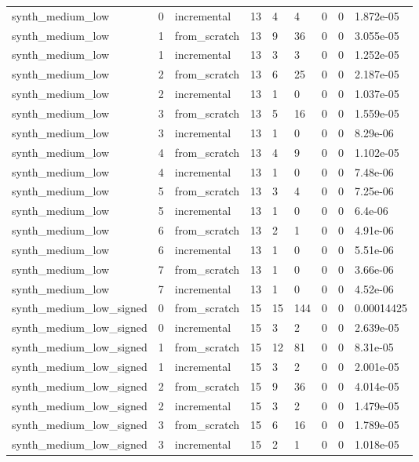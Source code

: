 \begin{table}[t]
\begin{tabular}{lllllllll}
synth\_medium\_low & 0 & incremental & 13 & 4 & 4 & 0 & 0 & 1.872e-05 \\
synth\_medium\_low & 1 & from\_scratch & 13 & 9 & 36 & 0 & 0 & 3.055e-05 \\
synth\_medium\_low & 1 & incremental & 13 & 3 & 3 & 0 & 0 & 1.252e-05 \\
synth\_medium\_low & 2 & from\_scratch & 13 & 6 & 25 & 0 & 0 & 2.187e-05 \\
synth\_medium\_low & 2 & incremental & 13 & 1 & 0 & 0 & 0 & 1.037e-05 \\
synth\_medium\_low & 3 & from\_scratch & 13 & 5 & 16 & 0 & 0 & 1.559e-05 \\
synth\_medium\_low & 3 & incremental & 13 & 1 & 0 & 0 & 0 & 8.29e-06 \\
synth\_medium\_low & 4 & from\_scratch & 13 & 4 & 9 & 0 & 0 & 1.102e-05 \\
synth\_medium\_low & 4 & incremental & 13 & 1 & 0 & 0 & 0 & 7.48e-06 \\
synth\_medium\_low & 5 & from\_scratch & 13 & 3 & 4 & 0 & 0 & 7.25e-06 \\
synth\_medium\_low & 5 & incremental & 13 & 1 & 0 & 0 & 0 & 6.4e-06 \\
synth\_medium\_low & 6 & from\_scratch & 13 & 2 & 1 & 0 & 0 & 4.91e-06 \\
synth\_medium\_low & 6 & incremental & 13 & 1 & 0 & 0 & 0 & 5.51e-06 \\
synth\_medium\_low & 7 & from\_scratch & 13 & 1 & 0 & 0 & 0 & 3.66e-06 \\
synth\_medium\_low & 7 & incremental & 13 & 1 & 0 & 0 & 0 & 4.52e-06 \\
synth\_medium\_low\_signed & 0 & from\_scratch & 15 & 15 & 144 & 0 & 0 & 0.00014425 \\
synth\_medium\_low\_signed & 0 & incremental & 15 & 3 & 2 & 0 & 0 & 2.639e-05 \\
synth\_medium\_low\_signed & 1 & from\_scratch & 15 & 12 & 81 & 0 & 0 & 8.31e-05 \\
synth\_medium\_low\_signed & 1 & incremental & 15 & 3 & 2 & 0 & 0 & 2.001e-05 \\
synth\_medium\_low\_signed & 2 & from\_scratch & 15 & 9 & 36 & 0 & 0 & 4.014e-05 \\
synth\_medium\_low\_signed & 2 & incremental & 15 & 3 & 2 & 0 & 0 & 1.479e-05 \\
synth\_medium\_low\_signed & 3 & from\_scratch & 15 & 6 & 16 & 0 & 0 & 1.789e-05 \\
synth\_medium\_low\_signed & 3 & incremental & 15 & 2 & 1 & 0 & 0 & 1.018e-05 \\

\end{tabular}
\end{table}

